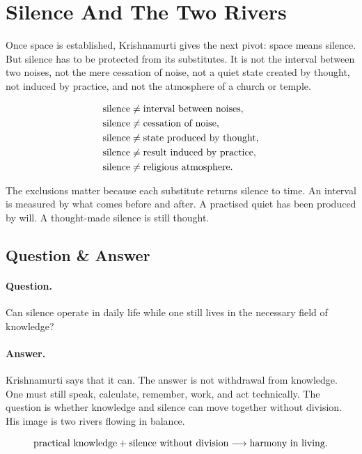 \documentclass[11pt,oneside]{book}
\begin{document}
\section{Silence And The Two Rivers}

Once space is established, Krishnamurti gives the next pivot: space means silence. But silence has to be protected from its substitutes. It is not the interval between two noises, not the mere cessation of noise, not a quiet state created by thought, not induced by practice, and not the atmosphere of a church or temple.

\begin{align}
\hbox{silence} &\neq \hbox{interval between noises},\\
\hbox{silence} &\neq \hbox{cessation of noise},\\
\hbox{silence} &\neq \hbox{state produced by thought},\\
\hbox{silence} &\neq \hbox{result induced by practice},\\
\hbox{silence} &\neq \hbox{religious atmosphere}.
\end{align}

The exclusions matter because each substitute returns silence to time. An interval is measured by what comes before and after. A practised quiet has been produced by will. A thought-made silence is still thought.

\subsection{Question \& Answer}

\paragraph{Question.}
Can silence operate in daily life while one still lives in the necessary field of knowledge?

\paragraph{Answer.}
Krishnamurti says that it can. The answer is not withdrawal from knowledge. One must still speak, calculate, remember, work, and act technically. The question is whether knowledge and silence can move together without division. His image is two rivers flowing in balance.

\begin{equation}
\hbox{practical knowledge}
+
\hbox{silence without division}
\longrightarrow
\hbox{harmony in living}.
\end{equation}
\end{document}
